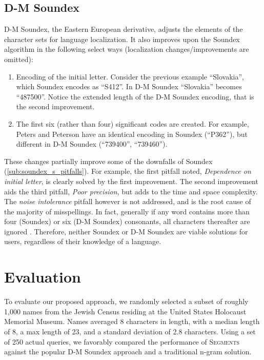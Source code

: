 \documentclass{endm}
\begin{document}
\begin{CJK}{UTF8}{song}
\subsection{D-M Soundex} %
\label{sub:d_m_soundex}

D-M Soundex, the Eastern European derivative, adjusts the elements of the character sets for language localization.  It also improves upon the Soundex algorithm in the following select ways (localization changes/improvements are omitted)\cite{mokotoff:soundexing}:

\begin{enumerate}
	\item Encoding of the initial letter.  Consider the previous example ``Slovakia'', which Soundex encodes as ``S412''.  In D-M Soundex ``Slovakia'' becomes ``487500''.  Notice the extended length of the D-M Soundex encoding, that is the second improvement.
	\item The first six (rather than four) significant codes are created.  For example, Peters and Peterson have an identical encoding in Soundex (``P362''), but different in D-M Soundex (``739400'', ``739460'').
\end{enumerate}

These changes partially improve some of the downfalls of Soundex (\ref{sub:soundex_s_pitfalls}).  For example, the first pitfall noted, \emph{Dependence on initial letter}, is clearly solved by the first improvement.  The second improvement aids the third pitfall, \emph{Poor precision}, but adds to the time and space complexity.  The \emph{noise intolerance} pitfall however is not addressed, and is the root cause of the majority of misspellings.  In fact, generally if any word contains more than four (Soundex) or six (D-M Soundex) consonants, all characters thereafter are ignored \cite{alexander:beider}. Therefore, neither Soundex or D-M Soundex are viable solutions for users, regardless of their knowledge of a language.




\section{Evaluation} %
\label{sec:evaluation}
To evaluate our proposed approach, we randomly selected a subset of roughly 1,000 names from the Jewish Census residing at the United States Holocaust Memorial Museum.  Names averaged 8 characters in length, with a median length of 8, a max length of 23, and a standard deviation of 2.8 characters.  Using a set of 250 actual queries, we favorably compared the performance of S\textsc{egments} against the popular D-M Soundex approach and a traditional n-gram solution.


\end{CJK}
\end{document}
